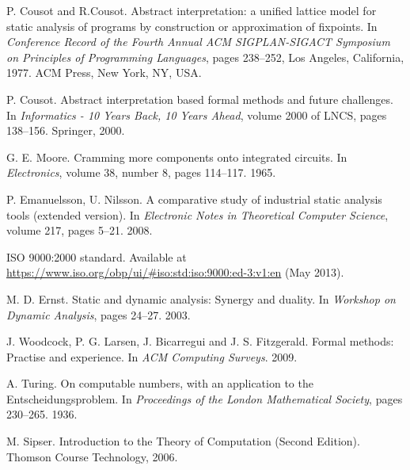 \documentclass[12pt,final,oneside]{fithesis2}
\theoremstyle{definition}
\begin{document}
\renewcommand*{\bibname}{\chapter{Bibliography}\vspace{-1em}}
\begin{thebibliography}{99}

P{.} Cousot and R{.}Cousot.
\newblock Abstract interpretation: a unified lattice model for static
  analysis of programs by construction or approximation of fixpoints.
\newblock In \emph{Conference Record of the Fourth Annual ACM
  SIGPLAN-SIGACT Symposium on Principles of Programming Languages},
  pages 238--252, Los Angeles, California, 1977. ACM Press, New York,
  NY, USA.

P{.} Cousot.
\newblock Abstract interpretation based formal methods and future
  challenges.
\newblock In \emph{Informatics - 10 Years Back, 10 Years Ahead},
  volume 2000 of LNCS, pages 138--156. Springer, 2000.

G{.} E{.} Moore.
\newblock Cramming more components onto integrated circuits.
\newblock In \emph{Electronics}, volume 38, number 8, pages 114--117. 1965.

P{.} Emanuelsson, U{.} Nilsson.
\newblock A comparative study of industrial static analysis tools (extended
  version).
\newblock In \emph{Electronic Notes in Theoretical Computer Science},
  volume 217, pages 5--21. 2008.

\newblock ISO 9000:2000 standard.
\newblock Available at \url{https://www.iso.org/obp/ui/#iso:std:iso:9000:ed-3:v1:en}
  (May 2013).

M{.} D{.} Ernst.
\newblock Static and dynamic analysis: Synergy and duality.
\newblock In \emph{Workshop on Dynamic Analysis}, pages 24--27. 2003.

J{.} Woodcock, P{.} G{.} Larsen, J{.} Bicarregui and J{.} S{.} Fitzgerald.
\newblock Formal methods: Practise and experience.
\newblock In \emph{ACM Computing Surveys}. 2009.

A{.} Turing.
\newblock On computable numbers, with an application to the
  Entscheidungsproblem.
\newblock In \emph{Proceedings of the London Mathematical Society},
  pages 230--265. 1936.

M{.} Sipser.
\newblock Introduction to the Theory of Computation (Second Edition).
\newblock Thomson Course Technology, 2006.


\end{thebibliography}
\end{document}
